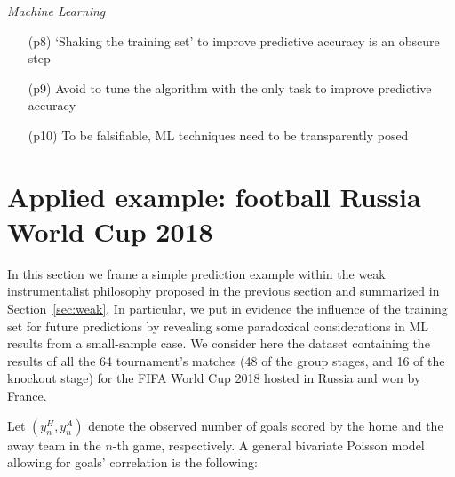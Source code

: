 \documentclass{statsoc}
\begin{document}
\begin{table}
{{\vspace{0.1cm}

\emph{ Machine Learning}
\begin{enumerate}
\item[(p8)] `Shaking the training set' to improve predictive accuracy is an obscure step
\vspace{-0.2cm}
\item[(p9)] Avoid to tune the algorithm with the only task to improve predictive accuracy
\vspace{-0.2cm}
\item[ (p10)] To be falsifiable, ML techniques need to be transparently posed
\end{enumerate}
 }}
\end{table}



\section{Applied example: football Russia World Cup 2018}
\label{sec:world}

\color{blue}

\color{black}

In this section we frame a simple prediction example within the weak instrumentalist philosophy proposed in the previous section and summarized in Section~\ref{sec:weak}. In particular, we put in evidence the influence of the training set for future predictions by revealing some paradoxical considerations  in ML results from  a small-sample case. We consider here the dataset containing the results of all the 64 tournament's matches (48 of the group stages, and 16 of the knockout stage) for the FIFA World Cup 2018 hosted in Russia and won by France.

Let $(y^{H}_{n}, y^{A}_{n})$ denote the observed number of goals scored by the home and the away team in the $n$-th game, respectively. A general bivariate Poisson model allowing for goals' correlation \citep{karlis2003analysis} is the following:
\end{document}
